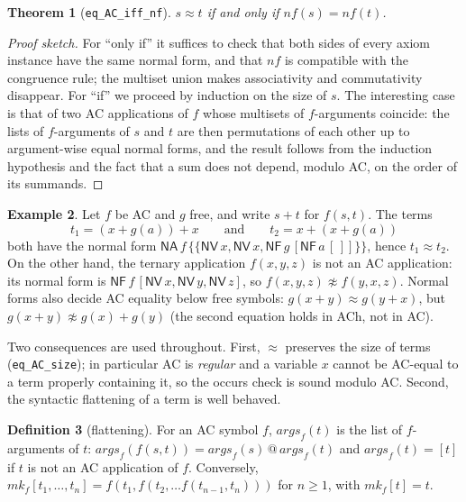 \documentclass[11pt,a4paper]{article}
\newtheorem{theorem}{Theorem}[section]
\theoremstyle{definition}
\newtheorem{definition}[theorem]{Definition}
\newtheorem{example}[theorem]{Example}
\theoremstyle{remark}
\newcommand{\isa}[1]{\mbox{\small\texttt{#1}}}
\newcommand{\eqAC}{\approx}
\newcommand{\nf}{\mathit{nf}}
\newcommand{\args}{\mathit{args}}
\newcommand{\mkac}{\mathit{mk}}
\newcommand{\mset}[1]{\{\!\{#1\}\!\}}
\begin{document}
\begin{theorem}[\isa{eq\_AC\_iff\_nf}]\label{thm:nf}
  $s \eqAC t$ if and only if $\nf(s) = \nf(t)$.
\end{theorem}

\begin{proof}[Proof sketch]
  For ``only if'' it suffices to check that both sides of every axiom instance have the same
  normal form, and that $\nf$ is compatible with the congruence rule; the multiset union makes
  associativity and commutativity disappear. For ``if'' we proceed by induction on the size of
  $s$. The interesting case is that of two AC applications of $f$ whose multisets of
  $f$-arguments coincide: the lists of $f$-arguments of $s$ and $t$ are then permutations of each
  other up to argument-wise equal normal forms, and the result follows from the induction
  hypothesis and the fact that a sum does not depend, modulo AC, on the order of its summands.
\end{proof}

\begin{example}\label{ex:nf}
  Let $f$ be AC and $g$ free, and write $s + t$ for $f(s,t)$. The terms
  \[
    t_1 = (x + g(a)) + x \qquad\text{and}\qquad t_2 = x + (x + g(a))
  \]
  both have the normal form $\mathsf{NA}\,f\,\mset{\mathsf{NV}\,x, \mathsf{NV}\,x,
  \mathsf{NF}\,g\,[\mathsf{NF}\,a\,[\,]]}$, hence $t_1 \eqAC t_2$. On the other hand, the
  ternary application $f(x, y, z)$ is not an AC application: its normal form is
  $\mathsf{NF}\,f\,[\mathsf{NV}\,x, \mathsf{NV}\,y, \mathsf{NV}\,z]$, so
  $f(x,y,z) \not\eqAC f(y,x,z)$. Normal forms also decide AC equality below free symbols:
  $g(x + y) \eqAC g(y + x)$, but $g(x + y) \not\eqAC g(x) + g(y)$ (the second equation holds
  in ACh, not in AC).
\end{example}

Two consequences are used throughout. First, $\eqAC$ preserves the size of terms
(\isa{eq\_AC\_size}); in particular AC is \emph{regular} and a variable $x$ cannot be
AC-equal to a term properly containing it, so the occurs check is sound modulo AC. Second, the
syntactic flattening of a term is well behaved.

\begin{definition}[flattening]
  For an AC symbol $f$, $\args_f(t)$ is the list of $f$-arguments of $t$:
  $\args_f(f(s,t)) = \args_f(s) \mathbin{@} \args_f(t)$ and $\args_f(t) = [t]$ if $t$ is not an
  AC application of $f$. Conversely, $\mkac_f[t_1,\dots,t_n] = f(t_1, f(t_2, \dots f(t_{n-1},
  t_n)))$ for $n \ge 1$, with $\mkac_f[t] = t$.
\end{definition}
\end{document}
